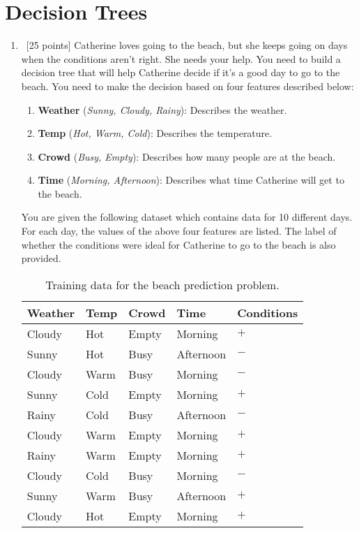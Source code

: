 \section{Decision Trees}
\label{sec:decision-trees}

\begin{enumerate}


\item~[25 points] 
  Catherine loves going to the beach, but she keeps going on days when the conditions aren't right. 
  She needs your help.
  You need to build a decision tree that will help Catherine decide if it's a good day to go to the beach. 
  You need to make the decision based on four features described below:

  \begin{enumerate}
  \item\textbf{Weather} (\textit{Sunny, Cloudy, Rainy}): Describes the weather.
  \item\textbf{Temp} (\textit{Hot, Warm, Cold}): Describes the temperature.
  \item\textbf{Crowd} (\textit{Busy, Empty}): Describes how many people are at the beach.
  \item\textbf{Time} (\textit{Morning, Afternoon}): Describes what time Catherine will get to the beach.
  \end{enumerate}

  You are given the following dataset which contains data for 10 different days. 
  For each day, the values of the above four features are listed. 
  The label of whether the conditions were ideal for Catherine to go to the beach is also provided.

  \begin{table}[h]
    \centering
    \begin{tabular}{llll|l}
      \hline
      Weather & Temp & Crowd & Time      & Conditions \\ \hline
      Cloudy  & Hot  & Empty & Morning   & $+$        \\
      Sunny   & Hot  & Busy  & Afternoon & $-$        \\
      Cloudy  & Warm & Busy  & Morning   & $-$        \\
      Sunny   & Cold & Empty & Morning   & $+$        \\
      Rainy   & Cold & Busy  & Afternoon & $-$        \\
      Cloudy  & Warm & Empty & Morning   & $+$        \\
      Rainy   & Warm & Empty & Morning   & $+$        \\
      Cloudy  & Cold & Busy  & Morning   & $-$        \\
      Sunny   & Warm & Busy  & Afternoon & $+$        \\
      Cloudy  & Hot  & Empty & Morning   & $+$        \\ \hline
    \end{tabular}
    \caption{Training data for the beach prediction problem.}
    \label{tab:decision-tree-train}
  \end{table}



\end{enumerate}
